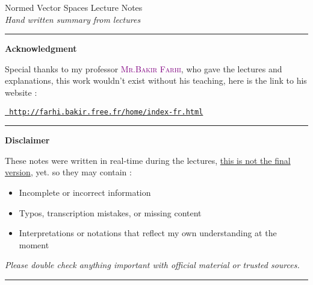\documentclass{report}
\begin{document}
\begin{titlepage}
   \begin{center}
       \vspace*{2cm}
       {\LARGE Normed Vector Spaces Lecture Notes}
       \\
       \vspace{1cm}
       {\large \it Hand written summary from lectures}
       \normalfont
       \vspace{1.5cm}
   \end{center}
 \rule{\textwidth}{0.4pt}
  \vspace{0.4cm}
  \begin{center}
  \textbf{Acknowledgment}
  \end{center}
  \begin{center}
Special thanks to my professor \textsc{\textcolor{purple}{\large Mr.Bakir Farhi}}\normalfont,
who gave the lectures and explanations, 
this work wouldn't exist without his teaching,
here is the link to his website :
  \end{center}
  \begin{center}
  \href{
  http://farhi.bakir.free.fr/home/index-fr.html
  }{\texttt{ \large
  http://farhi.bakir.free.fr/home/index-fr.html}}
\end{center}
\vspace{0.4cm}
\rule{\textwidth}{0.4pt}
\vspace{0.4cm}
\begin{center}
\textbf{Disclaimer} 
\end{center}
\begin{center}
These notes were written in real-time
during the lectures, 
\underline{this is not the final version}, yet. so they may contain : 
\begin{itemize}
  \item 
 Incomplete or incorrect information
 \item  
 Typos, transcription mistakes, or missing content
 \item  
 Interpretations or notations that reflect my own understanding
at the moment
\end{itemize}
\end{center}
  \begin{center}
    \it
    \large
Please double check anything important with official
material or trusted sources. \normalfont
\end{center}
\vspace{0.4cm}
\rule{\textwidth}{0.4pt}
\begin{center}

\end{center}
\end{titlepage}
\end{document}
